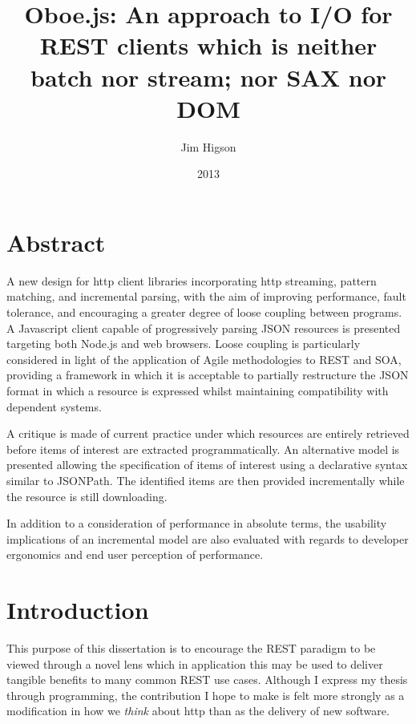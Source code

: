 \documentclass[]{article}
\title{Oboe.js: An approach to I/O for REST clients which is neither batch nor
       stream; nor SAX nor DOM}
\author{Jim Higson}
\date{2013}
\let\stdsection\section
\renewcommand\section{\newpage\stdsection}
\begin{document}
\maketitle


{
\clearpage
\hypersetup{linkcolor=black}
\setcounter{tocdepth}{3}
\tableofcontents
}

\clearpage
\listoffigures

\clearpage

\section{Abstract}

A new design for http client libraries incorporating http streaming,
pattern matching, and incremental parsing, with the aim of improving
performance, fault tolerance, and encouraging a greater degree of loose
coupling between programs. A Javascript client capable of progressively
parsing JSON resources is presented targeting both Node.js and web
browsers. Loose coupling is particularly considered in light of the
application of Agile methodologies to REST and SOA, providing a
framework in which it is acceptable to partially restructure the JSON
format in which a resource is expressed whilst maintaining compatibility
with dependent systems.

A critique is made of current practice under which resources are
entirely retrieved before items of interest are extracted
programmatically. An alternative model is presented allowing the
specification of items of interest using a declarative syntax similar to
JSONPath. The identified items are then provided incrementally while the
resource is still downloading.

In addition to a consideration of performance in absolute terms, the
usability implications of an incremental model are also evaluated with
regards to developer ergonomics and end user perception of performance.

\section{Introduction}

This purpose of this dissertation is to encourage the REST paradigm to
be viewed through a novel lens which in application this may be used to
deliver tangible benefits to many common REST use cases. Although I
express my thesis through programming, the contribution I hope to make
is felt more strongly as a modification in how we \emph{think} about
http than as the delivery of new software.
\end{document}

